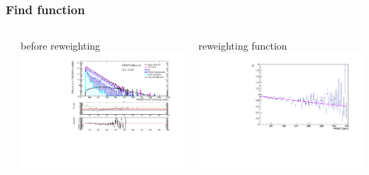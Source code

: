 \documentclass[bigger]{beamer}
\begin{document}
\begin{frame}
\frametitle{Find \met function}
\label{sec-1-9-3}
\begin{columns} %
\label{sec-1-9-3-1}
\begin{column}{0.6\textwidth}
\label{sec-1-9-3-1-1}

\centering
\met before reweighting
\includegraphics[width=\textwidth]{fig/enu/preselection/MET_PAS_enujj.pdf}
\end{column}
\begin{column}{0.6\textwidth}
\label{sec-1-9-3-1-2}

\centering
\met reweighting function
\includegraphics[width=\textwidth]{fig/enu/reweight/canvas_met.pdf}
\end{column}
\end{columns}
\label{sec-1-9-3-2}

\centering
{}
\end{frame}
\end{document}
